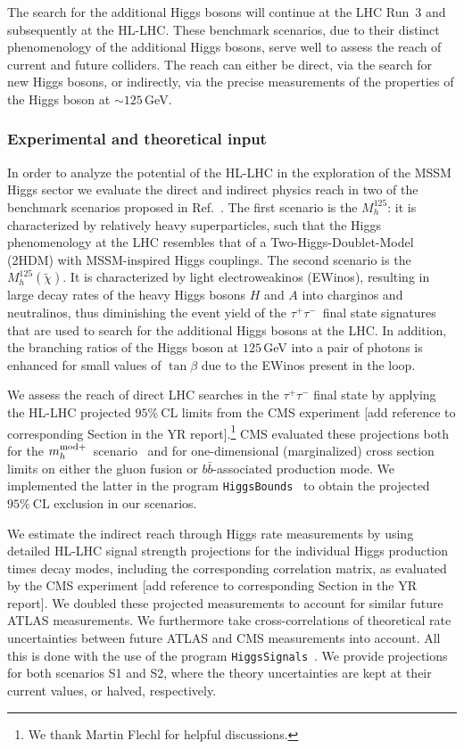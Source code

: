 \documentclass[../report.tex]{subfiles}
\begin{document}
The search for the additional Higgs bosons will continue at the LHC
Run~3 and subsequently at the HL-LHC. These benchmark scenarios, due to their distinct phenomenology of the additional Higgs bosons, serve well to assess the reach of current and future colliders. The reach can either be direct, via the search for new Higgs bosons, or indirectly, via the precise measurements of the properties of the Higgs boson at $\sim 125$\,GeV. 

\subsubsection*{Experimental and theoretical input}

In order to analyze the potential of the HL-LHC in the exploration of the MSSM Higgs sector we evaluate the direct and indirect physics reach in two of the benchmark scenarios proposed in Ref.~\cite{Bahl:2018zmf}. The first scenario is the $M_h^{125}$: it is characterized by relatively heavy superparticles, such that the Higgs phenomenology at the LHC resembles that of a Two-Higgs-Doublet-Model (2HDM) with MSSM-inspired Higgs couplings. The second scenario is the $M_h^{125}(\tilde{\chi})$. It is characterized by light electroweakinos (EWinos), resulting in large decay rates of the heavy Higgs bosons $H$ and $A$ into charginos and neutralinos, thus diminishing the event yield of the $\tau^+\tau^-$~final state signatures that are used to search
for the additional Higgs bosons at the LHC. In addition, the branching ratios of the Higgs boson at $125$\,GeV into a pair of photons is enhanced for small values of $\tan\beta$ due to the EWinos present in the loop.

We assess the reach of direct LHC searches in the  $\tau^+\tau^-$
final state by applying the  HL-LHC projected $95\%~\mathrm{CL}$
limits from the CMS experiment {\color{green}[add reference to corresponding Section in the YR report]}.\footnote{We thank Martin Flechl for helpful discussions.} CMS evaluated these projections both
for the $m_h^{{\rm mod}+}$~scenario~\cite{Carena:2013ytb} and for
one-dimensional (marginalized) cross section limits on either the
gluon fusion or $b\bar{b}$-associated production mode. We implemented the latter in the program
\texttt{HiggsBounds}~\cite{Bechtle:2008jh,Bechtle:2011sb,Bechtle:2013wla,Bechtle:2015pma} to obtain the projected $95\%~\mathrm{CL}$ exclusion in our
scenarios.

We estimate the indirect reach through Higgs rate measurements by
using detailed HL-LHC signal strength projections for the individual
Higgs production times decay modes, including the corresponding
correlation matrix, as evaluated by the CMS experiment {\color{green}[add reference to corresponding Section in the YR report]}. We doubled
these projected measurements to account for similar future ATLAS
measurements. We furthermore take cross-correlations of theoretical
rate uncertainties between future ATLAS and CMS measurements into
account. All this is done with the use of the program
\texttt{HiggsSignals}~\cite{Bechtle:2013xfa}. 
We provide projections for both scenarios S1 and S2, where the theory uncertainties are kept at their current values, or halved,
respectively.
\end{document}
